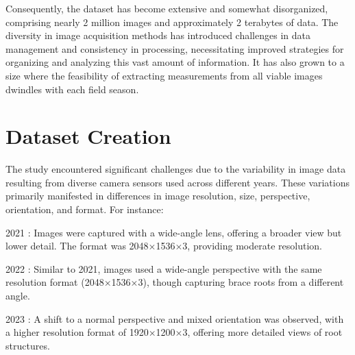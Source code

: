 Consequently, the dataset has become extensive and somewhat disorganized, comprising nearly 2 million images and approximately 2 terabytes of data. The diversity in image acquisition methods has introduced challenges in data management and consistency in processing, necessitating improved strategies for organizing and analyzing this vast amount of information. It has also grown to a size where the feasibility of extracting measurements from all viable images dwindles with each field season. 


\section{Dataset Creation}
The study encountered significant challenges due to the variability in image data resulting from diverse camera sensors used across different years. These variations primarily manifested in differences in image resolution, size, perspective, orientation, and format. For instance: 

    2021 : Images were captured with a wide-angle lens, offering a broader view but lower detail. The format was 2048×1536×3, providing moderate resolution. 

    2022 : Similar to 2021, images used a wide-angle perspective with the same resolution format (2048×1536×3), though capturing brace roots from a different angle. 

    2023 : A shift to a normal perspective and mixed orientation was observed, with a higher resolution format of 1920×1200×3, offering more detailed views of root structures. 

